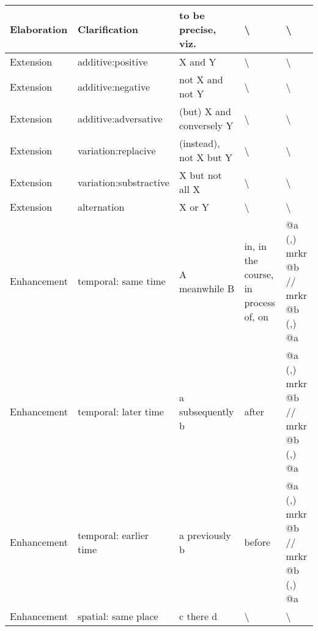 \begin{landscape}
\begin{longtable}{|l|l|p{3cm}|p{5cm}|p{5cm}|}
			Elaboration & Clarification          & to be precise, viz.                  & \textbackslash                                                            & \textbackslash                             \\ \hline
			Extension   & additive:positive      & X and Y                              & \textbackslash                                                            & \textbackslash                             \\ \hline
			Extension   & additive:negative      & not X and not Y                      & \textbackslash                                                            & \textbackslash                             \\ \hline
			Extension   & additive:adversative   & (but) X and conversely Y             & \textbackslash                                                            & \textbackslash                             \\ \hline
			Extension   & variation:replacive    & (instead), not X but Y               & \textbackslash                                                            & \textbackslash                             \\ \hline
			Extension   & variation:substractive & X but not all X                      & \textbackslash                                                            & \textbackslash                             \\ \hline
			Extension   & alternation            & X or Y                               & \textbackslash                                                            & \textbackslash                             \\ \hline
			Enhancement & temporal: same time    & A meanwhile B                        & in, in the course, in process of, on                                      & @a (,) mrkr @b // mrkr @b (,) @a           \\ \hline
			Enhancement & temporal: later time   & a subsequently b                     & after                                                                     & @a (,) mrkr @b // mrkr @b (,) @a           \\ \hline
			Enhancement & temporal: earlier time & a previously b                       & before                                                                    & @a (,) mrkr @b // mrkr @b (,) @a           \\ \hline
			Enhancement & spatial: same place    & c there d                            & \textbackslash                                                            & \textbackslash                             \\ \hline

\end{longtable}
\end{landscape}

